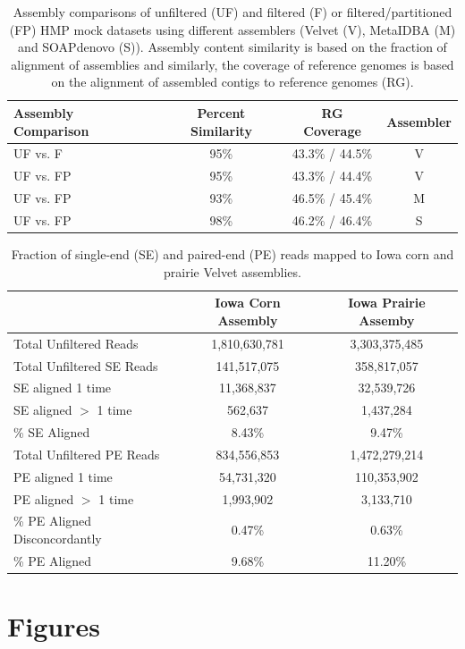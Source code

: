 \documentclass[11pt]{article} %
\begin{document}
\begin{table}[ht]
\caption{Assembly comparisons of unfiltered (UF) and filtered (F) or filtered/partitioned (FP) HMP mock datasets using different assemblers (Velvet (V), MetaIDBA (M) and SOAPdenovo (S)).  Assembly content similarity is based on the fraction of alignment of assemblies and similarly, the coverage of reference genomes is based on the alignment of assembled contigs to reference genomes (RG).}
\begin{tabular}{l c c c}
Assembly Comparison & Percent Similarity & RG Coverage & Assembler \\
\hline
UF vs. F & 95\% & 43.3\% / 44.5\% & V \\
UF vs. FP & 95\% & 43.3\% / 44.4\% & V\\
UF vs. FP & 93\% & 46.5\% / 45.4\% & M\\ 
UF vs. FP & 98\% &  46.2\% / 46.4\% & S\\
\end{tabular}
\label{assembly-compare}
\end{table}

\begin{table}[ht]
\caption{Fraction of single-end (SE) and paired-end (PE) reads mapped to Iowa corn and prairie Velvet assemblies.}
\begin{tabular}{l c c}
 & Iowa Corn Assembly & Iowa Prairie Assemby \\
 \hline
Total Unfiltered Reads	& 1,810,630,781	& 3,303,375,485\\
Total Unfiltered SE Reads &	141,517,075 &	358,817,057\\
SE aligned 1 time	& 11,368,837	& 32,539,726\\
SE aligned $>$ 1 time	& 562,637	& 1,437,284\\
\% SE Aligned & 	8.43\% &	9.47\% \\
Total Unfiltered PE Reads & 	834,556,853	& 1,472,279,214\\
PE aligned 1 time	& 54,731,320	& 110,353,902\\
PE aligned $>$ 1 time	&1,993,902	 & 3,133,710\\
\% PE Aligned Disconcordantly	 & 0.47\% &	 0.63\%\\
\% PE Aligned	& 9.68\%	& 11.20\%\\
\end{tabular}
\label{read-map}
\end{table}




\pagebreak
\section{Figures}
\end{document}
